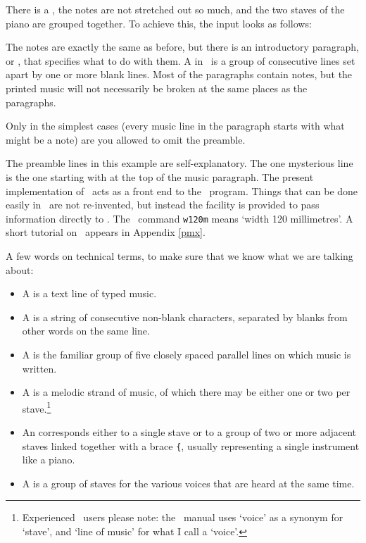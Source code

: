 \documentclass[11pt]{article}
\begin{document}
There is a , the notes are not stretched out so much, and the two 
staves of the piano are grouped together.  To achieve this, the input looks
as follows:

The notes are exactly the same as before, but there is an introductory 
paragraph, or , that specifies what to do with them.  A 
 in \MTx~is a group of consecutive lines set apart by 
one or more blank lines.  Most of the paragraphs contain notes, but the 
printed music will not necessarily be broken at the same places as 
the paragraphs. 

Only in the simplest cases (every music line in the paragraph starts with
what might be a note) are you allowed to omit the preamble.  

The preamble lines in this example are self-explanatory. The one 
mysterious line is the one starting with \ttxem{\%\%}at the top of 
the music paragraph.  The present 
implementation of \MTx~acts as a front end to the \PMX\ program.  
Things that 
can be done easily in \PMX\ are not re-invented, but instead the \ttxem{\%\%} 
facility is  provided to pass information directly to \PMX. The \PMX\ command 
\texttt{w120m}  means `width 120 millimetres'.  A short tutorial on \PMX\ 
appears in Appendix \ref{pmx}. 

A few words on technical terms, to make sure that we know what we are 
talking about:
\begin{itemize}
  \item  A  is a text line of typed music.
  \item  A  is a string of consecutive non-blank characters,
separated by blanks from other words on the same line.
  \item  A  is the familiar group of five closely spaced 
parallel lines on which music is written.
  \item  A  is a melodic strand of music, of which there 
may be either one or two per stave.\footnote{Experienced \PMX\ users 
please note: the \PMX\ manual uses `voice' as a synonym for `stave',
and `line of music' for what I call a `voice'.}
  \item An  corresponds either to a single stave or to a 
group of two or more adjacent staves linked together with a brace
\verb'{', usually representing a single instrument like a piano. 
  \item  A \ibxem{system} is a group of staves for the various 
voices that are heard at the same time.
\end{itemize}
\end{document}
